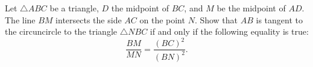 Let $\triangle{ABC}$ be a triangle, $D$ the midpoint of $BC$,  and $M$ be the midpoint of $AD$. The line $BM$ intersects the side $AC$ on the point $N$. Show that $AB$ is tangent to the circuncircle to the triangle $\triangle{NBC}$ if and only if the following equality is true:\[\frac{{BM}}{{MN}} =\frac{({BC})^2}{({BN})^2}.\]
